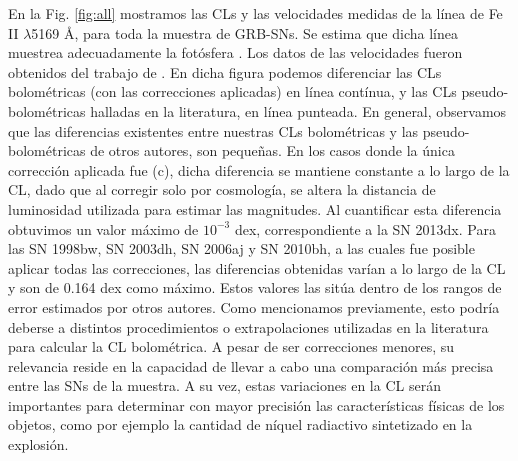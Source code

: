 \documentclass[baaa]{baaa}
\newcommand{\manu}[1]{\textcolor{red}{#1}}
\begin{document}
En la Fig. \ref{fig:all} mostramos las CLs y las velocidades medidas de la línea de Fe II $\lambda$5169 \AA, para toda la muestra de GRB-SNs. Se estima que dicha línea muestrea adecuadamente la fotósfera \citep{Dessart:2005,Schulze:2014}. Los datos de las velocidades fueron obtenidos del trabajo de \cite{Schulze:2014}. En dicha figura podemos diferenciar las CLs bolométricas (con las correcciones aplicadas) en línea contínua, y las CLs pseudo-bolométricas halladas en la literatura, en línea punteada. En general, observamos que las diferencias existentes entre nuestras CLs bolométricas y las pseudo-bolométricas de otros autores, son pequeñas. En los casos donde la única corrección aplicada fue (c), dicha diferencia se mantiene constante a lo largo de la CL, dado que al corregir solo por cosmología, se altera la distancia de luminosidad utilizada para estimar las magnitudes. %
Al cuantificar esta diferencia obtuvimos un valor máximo de $10^{-3}$ dex, correspondiente a la SN 2013dx. Para las SN 1998bw, SN 2003dh, SN 2006aj y SN 2010bh, a las cuales fue posible aplicar todas las correcciones, las diferencias obtenidas varían a lo largo de la CL y son de 0.164 dex como máximo. Estos valores las sitúa dentro de los rangos de error estimados por otros autores. %
Como mencionamos previamente, esto podría deberse a distintos procedimientos o extrapolaciones utilizadas en la literatura para calcular la CL bolométrica. %
A pesar de ser correcciones menores, su relevancia reside en la capacidad de llevar a cabo una comparación más precisa entre las SNs de la muestra. A su vez, estas variaciones en la CL serán importantes para determinar con mayor precisión las características físicas de los objetos, como por ejemplo la cantidad de n\'iquel radiactivo sintetizado en la explosión.


\end{document}
